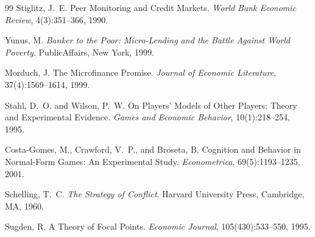 \documentclass[11pt,a4paper]{article}
\theoremstyle{definition}
\theoremstyle{remark}
\begin{document}
\begin{thebibliography}{99}
Stiglitz, J.~E.
\newblock Peer Monitoring and Credit Markets.
\newblock \emph{World Bank Economic Review}, 4(3):351--366, 1990.

Yunus, M.
\newblock \emph{Banker to the Poor: Micro-Lending and the Battle
  Against World Poverty}.
\newblock PublicAffairs, New York, 1999.

Morduch, J.
\newblock The Microfinance Promise.
\newblock \emph{Journal of Economic Literature}, 37(4):1569--1614, 1999.

Stahl, D.~O. and Wilson, P.~W.
\newblock On Players' Models of Other Players: Theory and Experimental
  Evidence.
\newblock \emph{Games and Economic Behavior}, 10(1):218--254, 1995.

Costa-Gomes, M., Crawford, V.~P., and Broseta, B.
\newblock Cognition and Behavior in Normal-Form Games: An Experimental
  Study.
\newblock \emph{Econometrica}, 69(5):1193--1235, 2001.

Schelling, T.~C.
\newblock \emph{The Strategy of Conflict}.
\newblock Harvard University Press, Cambridge, MA, 1960.

Sugden, R.
\newblock A Theory of Focal Points.
\newblock \emph{Economic Journal}, 105(430):533--550, 1995.

\end{thebibliography}
\end{document}
